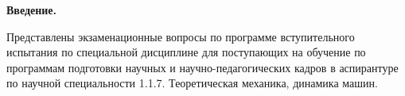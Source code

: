 \documentclass[main.tex]{subfiles}
\begin{document}
\textbf{Введение.}

\begin{nohyphen}
Представлены экзаменационные вопросы по программе вступительного испытания по специальной дисциплине для поступающих на обучение по программам подготовки научных и научно-педагогических кадров в аспирантуре по научной специальности 1.1.7. Теоретическая механика, динамика машин.
\end{nohyphen}
\vspace*{7mm}
\end{document}
